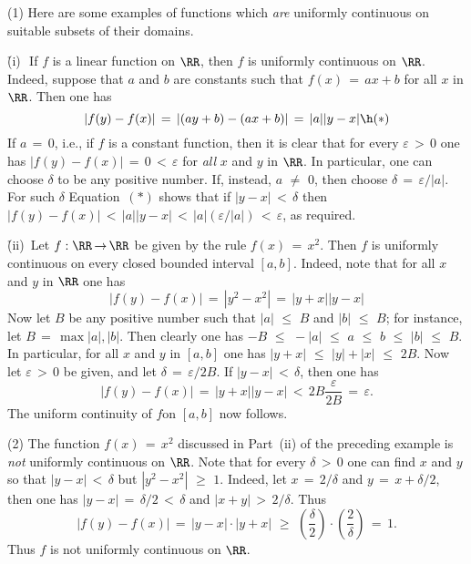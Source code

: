 {\hspace*{\parindent}(1) Here are some examples of functions which {\em are} uniformly continuous on suitable subsets of their domains.


        \h (i)\,\, If $f$ is a linear function on ${\RR}$, then $f$ is uniformly continuous on ${\RR}$.
    Indeed, suppose that $a$ and $b$ are constants such that $f(x) \,=\, ax+b$ for all $x$ in ${\RR}$.
    Then one has
        \begin{displaymath}
        |f(y) - f(x)| \,=\, |(ay+b) - (ax+b)| \,=\, |a||y-x| \h ({\ast})
        \end{displaymath}
    If $a \,=\, 0$, i.e., if $f$ is a constant function, then it is clear that for every ${\varepsilon}\,>\,0$ one has
    $|f(y)-f(x)| \,=\, 0\,<\,{\varepsilon}$ for {\em all} $x$ and $y$ in ${\RR}$.
    In particular, one can choose ${\delta}$ to be any positive number. If, instead, $a \,\,{\neq}\,\, 0$, then choose ${\delta} \,=\, {\varepsilon}/|a|$. For such ${\delta}$ Equation~$({\ast})$ shows that if $|y-x|\,<\,{\delta}$ then 
    $|f(y)-f(x)|\,<\,|a||y-x|\,<\,|a|\left({\varepsilon}/|a|\right)\,<\,{\varepsilon}$, as required.


        \h (ii)\, Let $f:{\RR} \,{\rightarrow}\, {\RR}$ be given by the rule $f(x) \,=\, x^{2}$.
    Then $f$ is uniformly continuous on every closed bounded interval $[a,b]$.
    Indeed, note that for all $x$ and $y$ in ${\RR}$ one has
        \begin{displaymath}
        |f(y)-f(x)| \,=\, |y^{2} - x^{2}| \,=\, |y+x||y-x|
        \end{displaymath}
    Now let $B$ be any positive number such that $|a|\,\,{\leq}\,\,B$ and $|b|\,\,{\leq}\,\,B$;
    for instance, let $B \,=\, \max{|a|,|b|}$. Then clearly one has $-B\,\,{\leq}\,\,-|a|\,\,{\leq}\,\,a\,\,{\leq}\,\,b\,\,{\leq}\,\,|b|\,\,{\leq}\,\,B$. In particular, for all $x$ and $y$ in $[a,b]$ one has $|y+x|\,\,{\leq}\,\,|y| + |x|\,\,{\leq}\,\,2B$.
    Now let ${\varepsilon}\,>\,0$ be given, and let ${\delta} \,=\, {\varepsilon}/2B$.
    If $|y-x|\,<\,{\delta}$, then one has
        \begin{displaymath}
        |f(y) - f(x)| \,=\, |y+x||y-x|\,<\,2B\frac{{\varepsilon}}{2B} \,=\, {\varepsilon}.
        \end{displaymath}
    The uniform continuity of $f$on $[a,b]$ now follows.


\V

        (2) The function $f(x) \,=\, x^{2}$ discussed in Part~(ii) of the preceding example is {\em not} uniformly continuous on ${\RR}$.
    Note that for every ${\delta}\,>\,0$ one can find $x$ and $y$ so that $|y-x|\,<\,{\delta}$ but $|y^{2}-x^{2}|\,\,{\geq}\,\,1$.
    Indeed, let $x \,=\, 2/{\delta}$ and $y \,=\, x+{\delta}/2$, then one has $|y-x| \,=\, {\delta}/2\,<\,{\delta}$ and $|x+y|\,>\,2/{\delta}$. Thus
        \begin{displaymath}
        |f(y) - f(x)| \,=\, |y-x|{\cdot}|y+x|\,\,{\geq}\,\,\left(\frac{{\delta}}{2}\right){\cdot}\left(\frac{2}{{\delta}}\right) \,=\, 1.
        \end{displaymath}
    Thus $f$ is not uniformly continuous on ${\RR}$.

}
